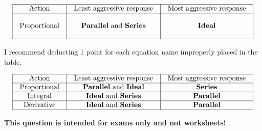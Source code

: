 
$$\vbox{\offinterlineskip
\halign{\strut
\vrule \quad\hfil # \ \hfil & 
\vrule \quad\hfil # \ \hfil & 
\vrule \quad\hfil # \ \hfil \vrule \cr
\noalign{\hrule}
%
Action & Least aggressive response & Most aggressive response \cr
%
\noalign{\hrule}
%
 &  &  \cr
Proportional & {\bf Parallel} and {\bf Series} & {\bf Ideal} \cr
 &  &  \cr
%
\noalign{\hrule}
} %
}$$ %








I recommend deducting 1 point for each equation name improperly placed in the table.


$$\vbox{\offinterlineskip
\halign{\strut
\vrule \quad\hfil # \ \hfil & 
\vrule \quad\hfil # \ \hfil & 
\vrule \quad\hfil # \ \hfil \vrule \cr
\noalign{\hrule}
%
Action & Least aggressive response & Most aggressive response \cr
%
\noalign{\hrule}
%
Proportional & {\bf Parallel} and {\bf Ideal} & {\bf Series} \cr
%
\noalign{\hrule}
%
Integral & {\bf Ideal} and {\bf Series} & {\bf Parallel}  \cr
%
\noalign{\hrule}
%
Derivative & {\bf Ideal} and {\bf Series} & {\bf Parallel} \cr
%
\noalign{\hrule}
} %
}$$ %







{\bf This question is intended for exams only and not worksheets!}.



